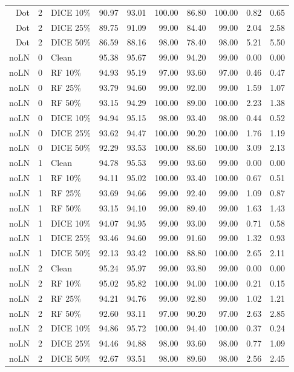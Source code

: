 {\begin{longtable}{rllrrrrrrr}
Dot & 2 & DICE 10\% & 90.97 & 93.01 & 100.00 & 86.80 & 100.00 & 0.82 & 0.65 \\
Dot & 2 & DICE 25\% & 89.75 & 91.09 & 99.00 & 84.40 & 99.00 & 2.04 & 2.58 \\
Dot & 2 & DICE 50\% & 86.59 & 88.16 & 98.00 & 78.40 & 98.00 & 5.21 & 5.50 \\
noLN & 0 & Clean & 95.38 & 95.67 & 99.00 & 94.20 & 99.00 & 0.00 & 0.00 \\
noLN & 0 & RF 10\% & 94.93 & 95.19 & 97.00 & 93.60 & 97.00 & 0.46 & 0.47 \\
noLN & 0 & RF 25\% & 93.79 & 94.60 & 99.00 & 92.00 & 99.00 & 1.59 & 1.07 \\
noLN & 0 & RF 50\% & 93.15 & 94.29 & 100.00 & 89.00 & 100.00 & 2.23 & 1.38 \\
noLN & 0 & DICE 10\% & 94.94 & 95.15 & 98.00 & 93.40 & 98.00 & 0.44 & 0.52 \\
noLN & 0 & DICE 25\% & 93.62 & 94.47 & 100.00 & 90.20 & 100.00 & 1.76 & 1.19 \\
noLN & 0 & DICE 50\% & 92.29 & 93.53 & 100.00 & 88.60 & 100.00 & 3.09 & 2.13 \\
noLN & 1 & Clean & 94.78 & 95.53 & 99.00 & 93.60 & 99.00 & 0.00 & 0.00 \\
noLN & 1 & RF 10\% & 94.11 & 95.02 & 100.00 & 93.40 & 100.00 & 0.67 & 0.51 \\
noLN & 1 & RF 25\% & 93.69 & 94.66 & 99.00 & 92.40 & 99.00 & 1.09 & 0.87 \\
noLN & 1 & RF 50\% & 93.15 & 94.10 & 99.00 & 89.40 & 99.00 & 1.63 & 1.43 \\
noLN & 1 & DICE 10\% & 94.07 & 94.95 & 99.00 & 93.00 & 99.00 & 0.71 & 0.58 \\
noLN & 1 & DICE 25\% & 93.46 & 94.60 & 99.00 & 91.60 & 99.00 & 1.32 & 0.93 \\
noLN & 1 & DICE 50\% & 92.13 & 93.42 & 100.00 & 88.80 & 100.00 & 2.65 & 2.11 \\
noLN & 2 & Clean & 95.24 & 95.97 & 99.00 & 93.80 & 99.00 & 0.00 & 0.00 \\
noLN & 2 & RF 10\% & 95.02 & 95.82 & 100.00 & 94.00 & 100.00 & 0.21 & 0.15 \\
noLN & 2 & RF 25\% & 94.21 & 94.76 & 99.00 & 92.80 & 99.00 & 1.02 & 1.21 \\
noLN & 2 & RF 50\% & 92.60 & 93.11 & 97.00 & 90.20 & 97.00 & 2.63 & 2.85 \\
noLN & 2 & DICE 10\% & 94.86 & 95.72 & 100.00 & 94.40 & 100.00 & 0.37 & 0.24 \\
noLN & 2 & DICE 25\% & 94.46 & 94.88 & 98.00 & 93.60 & 98.00 & 0.77 & 1.09 \\
noLN & 2 & DICE 50\% & 92.67 & 93.51 & 98.00 & 89.60 & 98.00 & 2.56 & 2.45 \\
\end{longtable}
}
